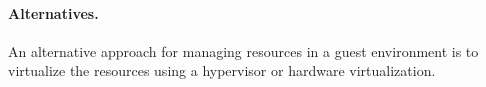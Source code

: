 \paragraph{Alternatives.}
An alternative approach for managing resources in a guest environment
is to virtualize the resources
using a hypervisor or hardware virtualization.


















